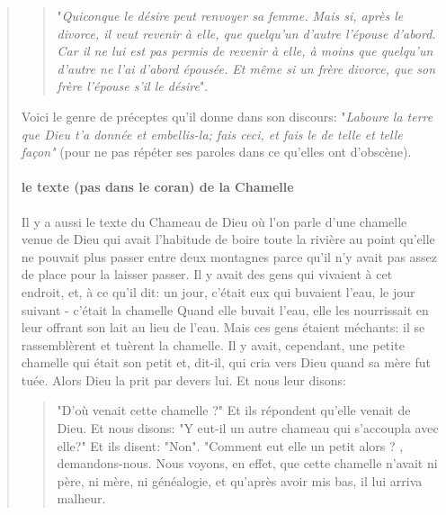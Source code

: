 \begin{quote}
\begin{quote}
    "\textit{Quiconque le désire peut renvoyer sa femme. Mais si, après le divorce, il veut revenir à elle, que quelqu'un d'autre l'épouse d'abord. Car il ne lui est pas permis de revenir à elle, à moins que quelqu'un d'autre ne l'ai d'abord épousée. Et même si un frère divorce, que son frère l'épouse s'il le désire}". 
\end{quote}
Voici le genre de préceptes qu'il donne dans son discours: "\textit{Laboure la terre que Dieu t'a donnée et embellis-la; fais ceci, et fais le de telle et telle façon"} (pour ne pas répéter ses paroles dans ce qu'elles ont d'obscène).

\paragraph{le texte (pas dans le coran) de la Chamelle}
Il y a aussi le texte du Chameau de Dieu où l'on parle d'une chamelle venue de Dieu qui avait l'habitude de boire toute la rivière au point qu'elle ne pouvait plus passer entre deux montagnes parce qu'il n'y avait pas assez de place pour la laisser passer. Il y avait des gens qui vivaient à cet endroit, et, à ce qu'il dit: un jour, c'était eux qui buvaient l'eau, le jour suivant - c'était la chamelle Quand elle buvait l'eau, elle les nourrissait en leur offrant son lait au lieu de l'eau. Mais ces gens étaient méchants: il se rassemblèrent et tuèrent la chamelle. Il y avait, cependant, une petite chamelle qui était son petit et, dit-il, qui cria vers Dieu quand sa mère fut tuée. Alors Dieu la prit par devers lui. Et nous leur disons: \begin{quote}
    "D'où venait cette chamelle ?" Et ils répondent qu'elle venait de Dieu. Et nous disons: "Y eut-il un autre chameau qui s'accoupla avec elle?" Et ils disent: "Non". "Comment eut elle un petit alors ? , demandons-nous. Nous voyons, en effet, que cette chamelle n'avait ni père, ni mère, ni généalogie, et qu'après avoir mis bas, il lui arriva malheur.
\end{quote} 

\end{quote}
